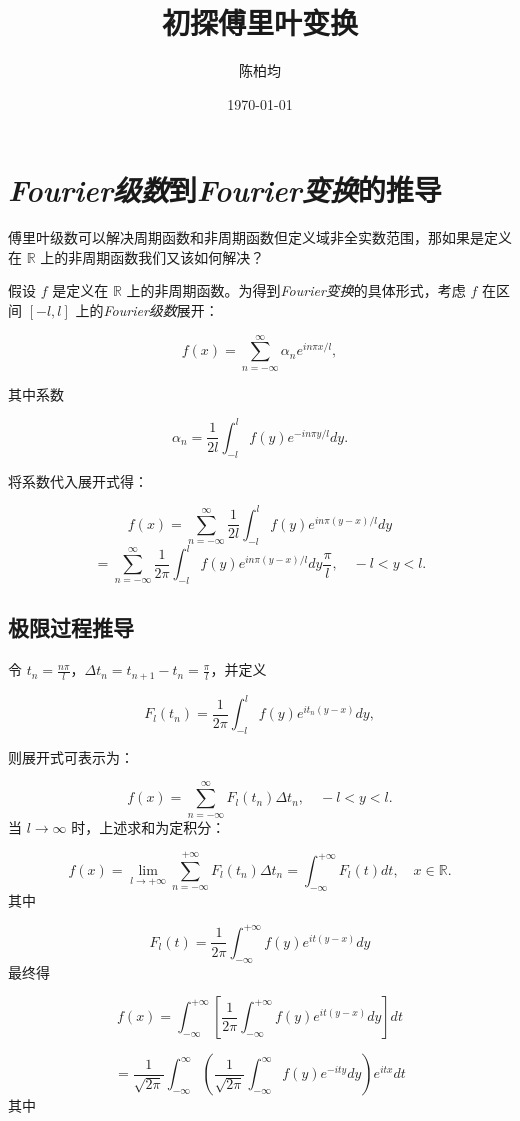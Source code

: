 \documentclass[12pt,a4paper]{article}
\title{初探傅里叶变换}
\author{陈柏均}
\date{\today}
\newcommand{\R}{\mathbb{R}}                %
\theoremstyle{plain}
\theoremstyle{definition}
\theoremstyle{remark}
\begin{document}
	
	\maketitle
	
	\section{\emph{Fourier级数}到\emph{Fourier变换}的推导}
	傅里叶级数可以解决周期函数和非周期函数但定义域非全实数范围，那如果是定义在 \(\R\) 上的非周期函数我们又该如何解决？
	
	
	假设 \( f \) 是定义在 \(\R\) 上的非周期函数。为得到\emph{Fourier变换}的具体形式，考虑 \( f \) 在区间 \([-l, l]\) 上的\emph{Fourier级数}展开：
	
	\[
	f(x) = \sum_{n=-\infty}^{\infty} \alpha_n e^{in\pi x/l},
	\]
	
	其中系数
	
	\[
	\alpha_n = \frac{1}{2l} \int_{-l}^{l} f(y)e^{-in\pi y/l} dy.
	\]
	
	将系数代入展开式得：
	
	\[
	f(x) = \sum_{n=-\infty}^{\infty} \frac{1}{2l} \int_{-l}^{l} f(y)e^{in\pi (y-x)/l} dy
	\]
	\[
	= \sum_{n=-\infty}^{\infty} \frac{1}{2\pi} \int_{-l}^{l} f(y)e^{in\pi (y-x)/l} dy  \frac{\pi}{l}, \quad -l < y < l.
	\]
	
	\subsection{极限过程推导}
	令 \( t_n = \frac{n\pi}{l} \)，\(\Delta t_n = t_{n+1} - t_n = \frac{\pi}{l}\)，并定义
	
	\[
	F_l(t_n) = \frac{1}{2\pi} \int_{-l}^{l} f(y)e^{it_n(y-x)} dy,
	\]
	
	则展开式可表示为：
	
	\[
	f(x) = \sum_{n=-\infty}^{\infty} F_l(t_n) \Delta t_n, \quad -l < y < l.
	\]
	当 \( l \to \infty \) 时，上述求和为定积分：
	
	\[
	f(x) = \lim_{l \to +\infty} \sum_{n=-\infty}^{+\infty} F_l(t_n) \Delta t_n = \int_{-\infty}^{+\infty} F_l(t) dt, \quad x \in \R.
	\]
	其中
	
	\[
	F_l(t) = \frac{1}{2\pi} \int_{-\infty}^{+\infty} f(y)e^{it(y-x)} dy
	\]
	最终得
	
	\[
	f(x) = \int_{-\infty}^{+\infty} \left[ \frac{1}{2\pi} \int_{-\infty}^{+\infty} f(y)e^{it(y-x)} dy \right] dt 
	\]
	
	\[
	= \frac{1}{\sqrt{2\pi}} \int_{-\infty}^{\infty} \left( \frac{1}{\sqrt{2\pi}} \int_{-\infty}^{\infty} f(y) e^{-i t y} dy \right) e^{i t x} dt
	\]
	其中
	
\end{document}
